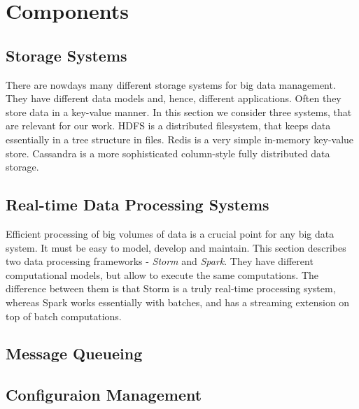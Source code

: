 \chapter{Components}
\label{chap:components}

\section{Storage Systems}

There are nowdays many different storage systems for big data management.
They have different data models and, hence, different applications.
Often they store data in a key-value manner.
In this section we consider three systems, that are relevant for our work.
HDFS is a distributed filesystem, that keeps data essentially in a tree structure in files.
Redis is a very simple in-memory key-value store.
Cassandra is a more sophisticated column-style fully distributed data storage.





\section{Real-time Data Processing Systems}

Efficient processing of big volumes of data is a crucial point for any big data system.
It must be easy to model, develop and maintain.
This section describes two data processing frameworks - \textit{Storm} and \textit{Spark}.
They have different computational models, but allow to execute the same computations.
The difference between them is that Storm is a truly real-time processing system, whereas Spark works essentially with batches, and has a streaming extension on top of batch computations.




\section{Message Queueing}






\section{Configuraion Management}

